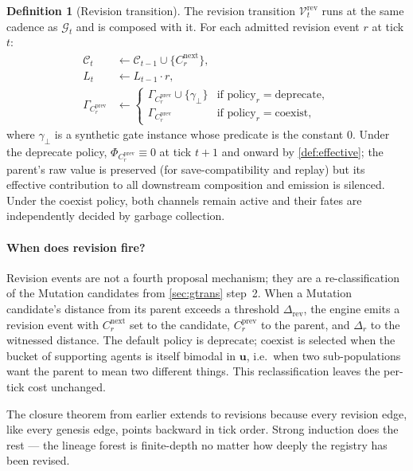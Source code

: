 \documentclass[journal,onecolumn,11pt]{IEEEtran}
\theoremstyle{definition}
\newtheorem{definition}{Definition}
\begin{document}
\begin{definition}[Revision transition]\label{def:revtrans}
The revision transition $\mathcal{V}_t^{\mathrm{rev}}$ runs at the same cadence as $\mathcal{G}_t$ and is composed with it. For each admitted revision event $r$ at tick $t$:
\begin{align*}
\mathcal{C}_t &\leftarrow \mathcal{C}_{t-1} \cup \{C_r^{\mathrm{next}}\}, \\
L_t &\leftarrow L_{t-1} \cdot r, \\
\Gamma_{C_r^{\mathrm{prev}}} &\leftarrow
\begin{cases}
\Gamma_{C_r^{\mathrm{prev}}} \cup \{\gamma_\bot\} & \text{if } \mathrm{policy}_r = \mathrm{deprecate}, \\
\Gamma_{C_r^{\mathrm{prev}}} & \text{if } \mathrm{policy}_r = \mathrm{coexist},
\end{cases}
\end{align*}
where $\gamma_\bot$ is a synthetic gate instance whose predicate is the constant $0$. Under the deprecate policy, $\Phi_{C_r^{\mathrm{prev}}} \equiv 0$ at tick $t+1$ and onward by \cref{def:effective}; the parent's raw value is preserved (for save-compatibility and replay) but its effective contribution to all downstream composition and emission is silenced. Under the coexist policy, both channels remain active and their fates are independently decided by garbage collection.
\end{definition}

\paragraph{When does revision fire?} Revision events are not a fourth proposal mechanism; they are a re-classification of the Mutation candidates from \cref{sec:gtrans} step~2. When a Mutation candidate's distance from its parent exceeds a threshold $\Delta_{\mathrm{rev}}$, the engine emits a revision event with $C_r^{\mathrm{next}}$ set to the candidate, $C_r^{\mathrm{prev}}$ to the parent, and $\Delta_r$ to the witnessed distance. The default policy is $\mathrm{deprecate}$; $\mathrm{coexist}$ is selected when the bucket of supporting agents is itself bimodal in $\mathbf{u}$, i.e.\ when two sub-populations want the parent to mean two different things. This reclassification leaves the per-tick cost unchanged.

The closure theorem from earlier extends to revisions because every revision edge, like every genesis edge, points backward in tick order. Strong induction does the rest --- the lineage forest is finite-depth no matter how deeply the registry has been revised.
\end{document}
